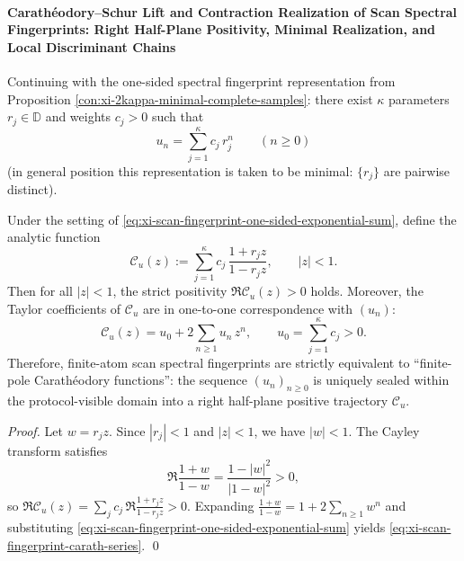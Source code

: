 \paragraph{Carath\'eodory--Schur Lift and Contraction Realization of Scan Spectral Fingerprints: Right Half-Plane Positivity, Minimal Realization, and Local Discriminant Chains}
Continuing with the one-sided spectral fingerprint representation from Proposition \ref{con:xi-2kappa-minimal-complete-samples}:
there exist \(\kappa\) parameters \(r_j\in\mathbb{D}\) and weights \(c_j>0\) such that
\begin{equation}\label{eq:xi-scan-fingerprint-one-sided-exponential-sum}
\boxed{\;
u_n=\sum_{j=1}^{\kappa}c_j\,r_j^n\qquad(n\ge 0)\;}
\end{equation}
(in general position this representation is taken to be minimal: \(\{r_j\}\) are pairwise distinct).

\begin{proposition}\label{prop:xi-scan-fingerprint-caratheodory-lift}
Under the setting of \eqref{eq:xi-scan-fingerprint-one-sided-exponential-sum}, define the analytic function
\begin{equation}\label{eq:xi-scan-fingerprint-carath}
\mathscr{C}_u(z):=\sum_{j=1}^{\kappa}c_j\,\frac{1+r_j z}{1-r_j z},
\qquad |z|<1.
\end{equation}
Then for all \(|z|<1\), the strict positivity \(\Re \mathscr{C}_u(z)>0\) holds.
Moreover, the Taylor coefficients of \(\mathscr{C}_u\) are in one-to-one correspondence with \((u_n)\):
\begin{equation}\label{eq:xi-scan-fingerprint-carath-series}
\boxed{\;
\mathscr{C}_u(z)
=u_0+2\sum_{n\ge 1}u_n\,z^n,\qquad u_0=\sum_{j=1}^{\kappa}c_j>0.\;}
\end{equation}
Therefore, finite-atom scan spectral fingerprints are strictly equivalent to ``finite-pole Carath\'eodory functions'': the sequence \((u_n)_{n\ge 0}\) is uniquely sealed within the protocol-visible domain into a right half-plane positive trajectory \(\mathscr{C}_u\).
\end{proposition}
\begin{proof}
Let \(w=r_j z\). Since \(|r_j|<1\) and \(|z|<1\), we have \(|w|<1\).
The Cayley transform satisfies
\[
\Re\frac{1+w}{1-w}=\frac{1-|w|^2}{|1-w|^2}>0,
\]
so \(\Re\mathscr{C}_u(z)=\sum_j c_j\,\Re\frac{1+r_j z}{1-r_j z}>0\).
Expanding
\(
\frac{1+w}{1-w}=1+2\sum_{n\ge 1}w^n
\)
and substituting \eqref{eq:xi-scan-fingerprint-one-sided-exponential-sum} yields \eqref{eq:xi-scan-fingerprint-carath-series}. \qed
\end{proof}

